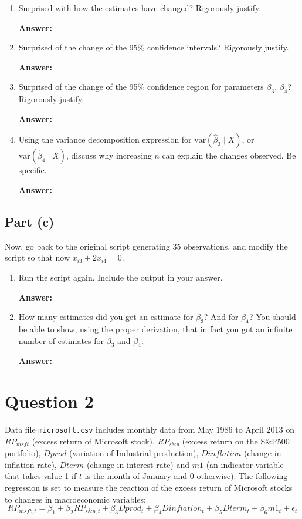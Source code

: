 \documentclass[12pt,a4paper]{article}
\begin{document}
\begin{enumerate}[label=(\roman*)]
  \item Surprised with how the estimates have changed? Rigorously justify.
  
  \textbf{Answer:} 
  
  \item Surprised of the change of the 95\% confidence intervals? Rigorously justify.
  
  \textbf{Answer:} 
  
  \item Surprised of the change of the 95\% confidence region for parameters $\beta_3$, $\beta_4$? Rigorously justify.
  
  \textbf{Answer:} 
  
  \item Using the variance decomposition expression for $\text{var}(\hat{\beta}_3 \mid X)$, or $\text{var}(\hat{\beta}_4 \mid X)$, discuss why increasing $n$ can explain the changes observed. Be specific.
  
  \textbf{Answer:} 
\end{enumerate}

\subsection*{Part (c)}
Now, go back to the original script generating 35 observations, and modify the script so that now $x_{i3} + 2x_{i4} = 0$.

\begin{enumerate}[label=(\roman*)]
  \item Run the script again. Include the output in your answer.
  
  \textbf{Answer:} 
  
  \item How many estimates did you get an estimate for $\beta_3$? And for $\beta_4$? You should be able to show, using the proper derivation, that in fact you got an infinite number of estimates for $\beta_3$ and $\beta_4$.
  
  \textbf{Answer:} 
\end{enumerate}

\newpage

\section*{Question 2}
Data file \texttt{microsoft.csv} includes monthly data from May 1986 to April 2013 on $RP_{msft}$ (excess return of Microsoft stock), $RP_{s\&p}$ (excess return on the S\&P500 portfolio), $Dprod$ (variation of Industrial production), $Dinflation$ (change in inflation rate), $Dterm$ (change in interest rate) and $m1$ (an indicator variable that takes value 1 if $t$ is the month of January and 0 otherwise). The following regression is set to measure the reaction of the excess return of Microsoft stocks to changes in macroeconomic variables:
\[
RP_{msft,t} = \beta_1 + \beta_2 RP_{s\&p,t} + \beta_3 Dprod_t + \beta_4 Dinflation_t + \beta_5 Dterm_t + \beta_6 m1_t + \epsilon_t
\]
\end{document}
